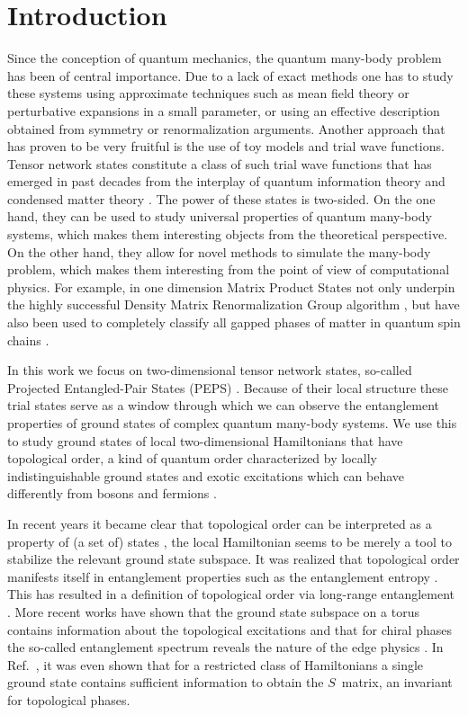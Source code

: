 \documentclass[12 pt]{article}
\begin{document}
\section{Introduction} \label{sec:intro}
Since the conception of quantum mechanics, the quantum many-body problem has been of central importance. Due to a lack of exact methods one has to study these systems using approximate techniques such as mean field theory or perturbative expansions in a small parameter, or using an effective description obtained from symmetry or renormalization arguments. Another approach that has proven to be very fruitful is the use of toy models and trial wave functions. Tensor network states constitute a class of such trial wave functions that has emerged in past decades from the interplay of quantum information theory and condensed matter theory \cite{VerstraeteMurgCirac08}. The power of these states is two-sided. On the one hand, they can be used to study universal properties of quantum many-body systems, which makes them interesting objects from the theoretical perspective. On the other hand,  they allow for novel methods to simulate the many-body problem, which makes them interesting from the point of view of computational physics. For example, in one dimension Matrix Product States not only underpin the highly successful Density Matrix Renormalization Group algorithm \cite{DMRG,OstlundRommer}, but have also been used to completely classify all gapped phases of matter in quantum spin chains \cite{1Done,1Dtwo,SchuchGarciaCirac11}.

In this work we focus on two-dimensional tensor network states, so-called Projected Entangled-Pair States (PEPS) \cite{peps}. Because of their local structure these trial states serve as a window through which we can observe the entanglement properties of ground states of complex quantum many-body systems. We use this to study ground states of local two-dimensional Hamiltonians that have topological order, a kind of quantum order characterized by locally indistinguishable ground states and exotic excitations which can behave differently from bosons and fermions \cite{einarsson,Wen90}.

In recent years it became clear that topological order can be interpreted as a property of (a set of) states \cite{BravyiHastingsVerstraete}, the local Hamiltonian seems to be merely a tool to stabilize the relevant ground state subspace. It was realized that topological order manifests itself in entanglement properties such as the entanglement entropy \cite{KitaevPreskill,levinwenentanglement}. This has resulted in a definition of topological order via long-range entanglement \cite{LRE}. More recent works have shown that the ground state subspace on a torus contains information about the topological excitations \cite{MES} and that for chiral phases the so-called entanglement spectrum reveals the nature of the edge physics \cite{LiHaldane}. In Ref.~\cite{haah}, it was even shown that for a restricted class of Hamiltonians a single ground state contains sufficient information to obtain the $S$~matrix, an invariant for topological phases.
\end{document}
